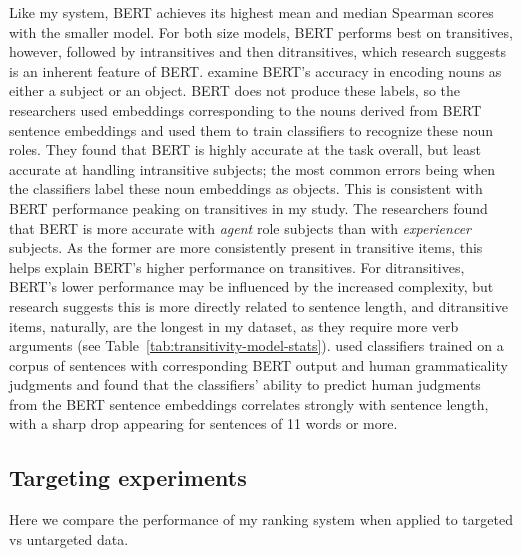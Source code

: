 Like my system, BERT achieves its highest mean and median Spearman scores with the smaller model. For both size models, BERT performs best on transitives, however, followed by intransitives and then ditransitives, which research suggests is an inherent feature of BERT. \citet{papadimitriou2021multilingual} examine BERT's accuracy in encoding nouns as either a subject or an object. BERT does not produce these labels, so the researchers used embeddings corresponding to the nouns derived from BERT sentence embeddings and used them to train classifiers to recognize these noun roles. They found that BERT is highly accurate at the task overall, but least accurate at handling intransitive subjects; the most common errors being when the classifiers label these noun embeddings as objects. This is consistent with BERT performance peaking on transitives in my study. The researchers found that BERT is more accurate with \textit{agent} role subjects than with \textit{experiencer} subjects. As the former are more consistently present in transitive items, this helps explain BERT's higher performance on transitives. For ditransitives, BERT's lower performance may be influenced by the increased complexity, but research suggests this is more directly related to sentence length, and ditransitive items, naturally, are the longest in my dataset, as they require more verb arguments (see Table~\ref{tab:transitivity-model-stats}). \citet{warstadt2019} used classifiers trained on a corpus of sentences with corresponding BERT output and human grammaticality judgments and found that the classifiers' ability to predict human judgments from the BERT sentence embeddings correlates strongly with sentence length, with a sharp drop appearing for sentences of 11 words or more. 

\subsection{Targeting experiments}
\label{sec:exp-targeting}
Here we compare the performance of my ranking system when applied to targeted vs untargeted data.

